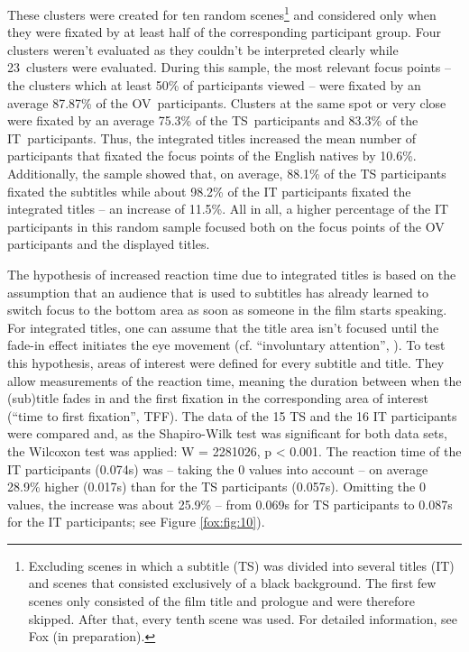 \documentclass[output=paper]{langsci/langscibook}
\begin{document}
These clusters were created for ten random scenes\footnote{Excluding scenes in which a subtitle (TS) was divided into several titles (IT) and scenes that consisted exclusively of a black background. The first few scenes only consisted of the film title and prologue and were therefore skipped. After that, every tenth scene was used. For detailed information, see Fox (in preparation).} and considered only when they were fixated by at least half of the corresponding participant group. Four clusters weren’t evaluated as they couldn’t be interpreted clearly while 23~clusters were evaluated. During this sample, the most relevant focus points – the clusters which at least 50\% of participants viewed – were fixated by an average 87.87\% of the OV~participants. Clusters at the same spot or very close were fixated by an average 75.3\% of the TS~participants and 83.3\% of the IT~participants. Thus, the integrated titles increased the mean number of participants that fixated the focus points of the English natives by 10.6\%. Additionally, the sample showed that, on average, 88.1\% of the TS participants fixated the subtitles while about 98.2\% of the IT participants fixated the integrated titles – an increase of 11.5\%. All in all, a higher percentage of the IT participants in this random sample focused both on the focus points of the OV participants and the displayed titles.



The hypothesis of increased reaction time due to integrated titles is based on the assumption that an audience that is used to subtitles has already learned to switch focus to the bottom area as soon as someone in the film starts speaking. For integrated titles, one can assume that the title area isn’t focused until the fade-in effect initiates the eye movement (cf. “involuntary attention”, \citet[74]{prinzmetal2005}). To test this hypothesis, areas of interest were defined for every subtitle and title. They allow measurements of the reaction time, meaning the duration between when the (sub)title fades in and the first fixation in the corresponding area of interest (“time to first fixation”, TFF). The data of the 15 TS and the 16 IT participants were compared and, as the Shapiro-Wilk test was significant for both data sets, the Wilcoxon test was applied: W = 2281026, p {\textless} 0.001. The reaction time of the IT participants (0.074s) was – taking the 0 values into account – on average 28.9\% higher (0.017s) than for the TS participants (0.057s). Omitting the 0 values, the increase was about 25.9\% – from 0.069s for TS participants to 0.087s for the IT participants; see Figure \ref{fox:fig:10}).
\end{document}
